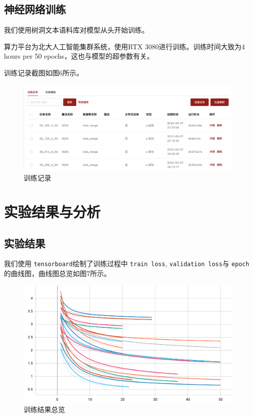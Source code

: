 \documentclass[12pt,a4paper]{article}
\begin{document}
\subsection{神经网络训练}
    我们使用树洞文本语料库对模型从头开始训练。
    
    算力平台为北大人工智能集群系统，使用RTX 3080进行训练。训练时间大致为4 hours per 50 epochs，这也与模型的超参数有关。
    
    训练记录截图如图6所示。
    
    \begin{figure}[!h]
        \centering
        \includegraphics[width=1\textwidth]{图片4.png}
        \caption{训练记录}
    \end{figure}


\section{实验结果与分析}
\subsection{实验结果}
我们使用 \verb|tensorboard|绘制了训练过程中 \verb|train loss|, \verb|validation loss|与 \verb|epoch|的曲线图，曲线图总览如图7所示。

\begin{figure}[!h]
        \centering
        \includegraphics[width=1\textwidth]{图片9.png}
        \caption{训练结果总览}
\end{figure}
\end{document}
